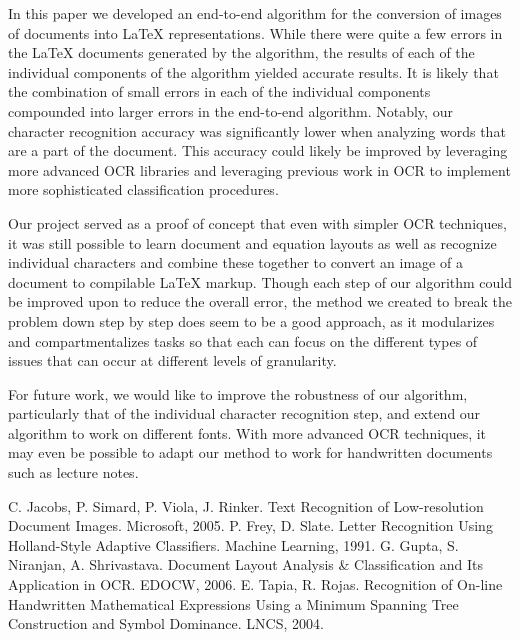 \documentclass[10pt]{IEEEtran}
\newcommand{\latex}{\LaTeX\xspace}
\begin{document}
In this paper we developed an end-to-end algorithm for the conversion of images of documents into \latex representations. While there were quite a few errors in the \latex documents generated by the algorithm, the results of each of the individual components of the algorithm yielded accurate results. It is likely that the combination of small errors in each of the individual components compounded into larger errors in the end-to-end algorithm. Notably, our character recognition accuracy was significantly lower when analyzing words that are a part of the document. This accuracy could likely be improved by leveraging more advanced OCR libraries and leveraging previous work in OCR to implement more sophisticated classification procedures.

Our project served as a proof of concept that even with simpler OCR techniques, it was still possible to learn document and equation layouts as well as recognize individual characters and combine these together to convert an image of a document to compilable \latex markup. Though each step of our algorithm could be improved upon to reduce the overall error, the method we created to break the problem down step by step does seem to be a good approach, as it modularizes and compartmentalizes tasks so that each can focus on the different types of issues that can occur at different levels of granularity.

For future work, we would like to improve the robustness of our algorithm, particularly that of the individual character recognition step, and extend our algorithm to work on different fonts. With more advanced OCR techniques, it may even be possible to adapt our method to work for handwritten documents such as lecture notes.

\begin{thebibliography}{1}
 C. Jacobs, P. Simard, P. Viola, J. Rinker. Text Recognition of Low-resolution Document Images. Microsoft, 2005.
 P. Frey, D. Slate. Letter Recognition Using Holland-Style Adaptive Classifiers. Machine Learning, 1991.
 G. Gupta, S. Niranjan, A. Shrivastava. Document Layout Analysis \& Classification and Its Application in OCR. EDOCW, 2006.
 E. Tapia, R. Rojas. Recognition of On-line Handwritten Mathematical Expressions Using a Minimum Spanning Tree Construction and Symbol Dominance. LNCS, 2004.
\end{thebibliography}

\end{document}
